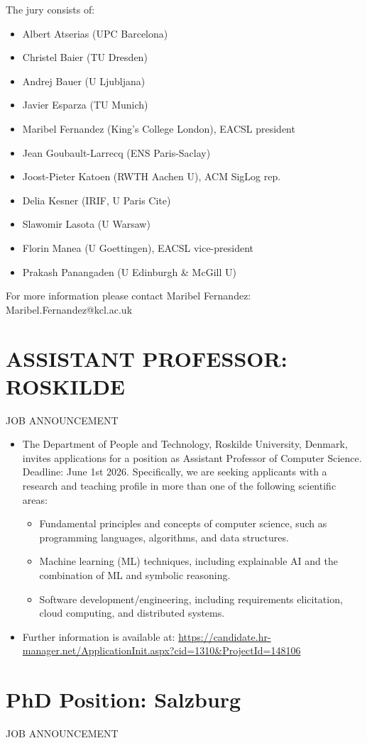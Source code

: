 \documentclass[prodmode,acmtecs]{acmsmall} %
\begin{document}
\begin{itemize}
  The jury consists of: 
 
\begin{itemize}\item  Albert Atserias (UPC Barcelona)
\item  Christel Baier (TU Dresden)
\item  Andrej Bauer (U Ljubljana)
\item  Javier Esparza (TU Munich)
\item  Maribel Fernandez (King’s College London), EACSL president
\item  Jean Goubault-Larrecq (ENS Paris-Saclay)
\item  Joost-Pieter Katoen (RWTH Aachen U), ACM SigLog rep.
\item  Delia Kesner (IRIF, U Paris Cite)
\item  Slawomir Lasota (U Warsaw)
\item  Florin Manea (U Goettingen), EACSL vice-president
\item  Prakash Panangaden (U Edinburgh \& McGill U)
\end{itemize} 
  For more information please contact Maribel Fernandez: Maribel.Fernandez@kcl.ac.uk 
 
\end{itemize}\section{ASSISTANT PROFESSOR: ROSKILDE}\label{ASSISTANTPROFESSOR}JOB ANNOUNCEMENT 

\begin{itemize}\item  The Department of People and Technology, Roskilde University, Denmark, invites applications for a position as Assistant Professor of Computer Science. Deadline: June 1st 2026. Specifically, we are seeking applicants with a research and teaching profile in more than one of the following scientific areas:  
 
\begin{itemize}\item  Fundamental principles and concepts of computer science, such as programming languages, algorithms, and data structures.
\item  Machine learning (ML) techniques, including explainable AI and the combination of ML and symbolic reasoning.
\item  Software development/engineering, including requirements elicitation, cloud computing, and distributed systems.
\end{itemize} 
\item  Further information is available at: \href{https://candidate.hr-manager.net/ApplicationInit.aspx?cid=1310\&ProjectId=148106}{https://candidate.hr-manager.net/ApplicationInit.aspx?cid=1310\&ProjectId=148106}                   
 
\end{itemize}\section{PhD Position: Salzburg}\label{PhDPosition}JOB ANNOUNCEMENT 
\end{document}
